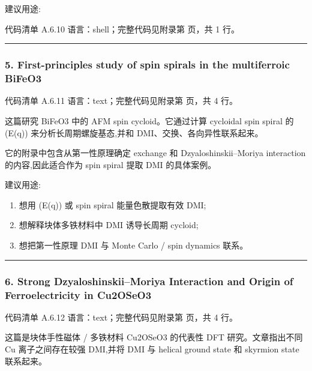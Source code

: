 \documentclass[lang=cn,scheme=chinese,color=blue,device=normal,toc=onecol,math=cm]{elegantbook}
\begin{document}
建议用途:\par


\begin{codeindexbox}{代码清单 A.6.10}
语言：shell；完整代码见附录第 \pageref{code:6:10} 页，共 1 行。
\end{codeindexbox}


\medskip\hrule\medskip


\subsubsection{5. First-principles study of spin spirals in the multiferroic BiFeO3}


\begin{codeindexbox}{代码清单 A.6.11}
语言：text；完整代码见附录第 \pageref{code:6:11} 页，共 4 行。
\end{codeindexbox}


这篇研究 BiFeO3 中的 AFM spin cycloid。它通过计算 cycloidal spin spiral 的 (E(q)) 来分析长周期螺旋基态,并和 DMI、交换、各向异性联系起来。\par


它的附录中包含从第一性原理确定 exchange 和 Dzyaloshinskii–Moriya interaction 的内容,因此适合作为 spin spiral 提取 DMI 的具体案例。\par


建议用途:\par


\begin{enumerate}
\item 想用 (E(q)) 或 spin spiral 能量色散提取有效 DMI;
\item 想解释块体多铁材料中 DMI 诱导长周期 cycloid;
\item 想把第一性原理 DMI 与 Monte Carlo /\allowbreak{} spin dynamics 联系。
\end{enumerate}


\medskip\hrule\medskip


\subsubsection{6. Strong Dzyaloshinskii–Moriya Interaction and Origin of Ferroelectricity in Cu2OSeO3}


\begin{codeindexbox}{代码清单 A.6.12}
语言：text；完整代码见附录第 \pageref{code:6:12} 页，共 4 行。
\end{codeindexbox}


这篇是块体手性磁体 /\allowbreak{} 多铁材料 Cu2OSeO3 的代表性 DFT 研究。文章指出不同 Cu 离子之间存在较强 DMI,并将 DMI 与 helical ground state 和 skyrmion state 联系起来。\par
\end{document}
